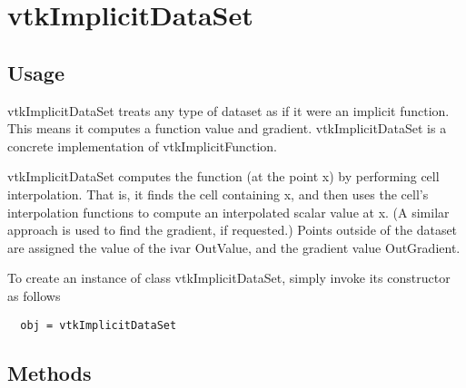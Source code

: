 \section{vtkImplicitDataSet}

\subsection{Usage}

 vtkImplicitDataSet treats any type of dataset as if it were an
 implicit function. This means it computes a function value and 
 gradient. vtkImplicitDataSet is a concrete implementation of 
 vtkImplicitFunction.

 vtkImplicitDataSet computes the function (at the point x) by performing 
 cell interpolation. That is, it finds the cell containing x, and then
 uses the cell's interpolation functions to compute an interpolated
 scalar value at x. (A similar approach is used to find the
 gradient, if requested.) Points outside of the dataset are assigned 
 the value of the ivar OutValue, and the gradient value OutGradient.

To create an instance of class vtkImplicitDataSet, simply
invoke its constructor as follows
\begin{verbatim}
  obj = vtkImplicitDataSet
\end{verbatim}
\subsection{Methods}

